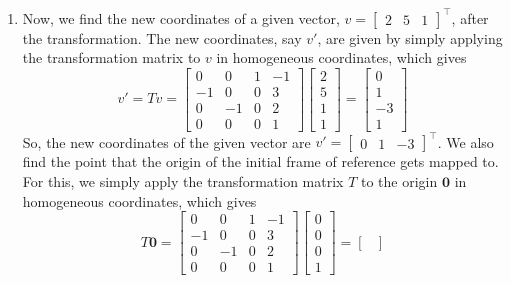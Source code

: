\documentclass[10pt]{article}
\begin{document}
\begin{enumerate}
        \item Now, we find the new coordinates of a given vector,
        $v = \begin{bmatrix} 2 & 5 & 1 \end{bmatrix}^{\top}$, after the transformation.
        The new coordinates, say $v'$, are given by simply applying the transformation
        matrix to $v$ in homogeneous coordinates, which gives
        \begin{equation*}
            v' = T v = \begin{bmatrix}
                0 & 0 & 1 & -1 \\
                -1 & 0 & 0 & 3 \\
                0 & -1 & 0 & 2 \\
                0 & 0 & 0 & 1
            \end{bmatrix} \begin{bmatrix} 2 \\ 5 \\ 1 \\ 1 \end{bmatrix} = \begin{bmatrix}
                0 \\
                1 \\
                -3 \\
                1
            \end{bmatrix}
        \end{equation*}
        So, the new coordinates of the given vector are
        $v' = \begin{bmatrix} 0 & 1 & -3 \end{bmatrix}^{\top}$. We also find the point
        that the origin of the initial frame of reference gets mapped to. For this, we
        simply apply the transformation matrix $T$ to the origin $\mathbf{0}$ in homogeneous
        coordinates, which gives
        \begin{equation*}
            T \mathbf{0} = \begin{bmatrix}
                0 & 0 & 1 & -1 \\
                -1 & 0 & 0 & 3 \\
                0 & -1 & 0 & 2 \\
                0 & 0 & 0 & 1
            \end{bmatrix} \begin{bmatrix} 0 \\ 0 \\ 0 \\ 1 \end{bmatrix} = \begin{bmatrix}

\end{bmatrix}
\end{equation*}
\end{enumerate}
\end{document}
